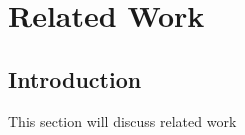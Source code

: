 
\chapter{Related Work}

\ifpdf
    \graphicspath{{Chapter3/Figs/Raster/}{Chapter3/Figs/PDF/}{Chapter3/Figs/}}
\else
    \graphicspath{{Chapter3/Figs/Vector/}{Chapter3/Figs/}}
\fi

\section{Introduction}

This section will discuss related work


